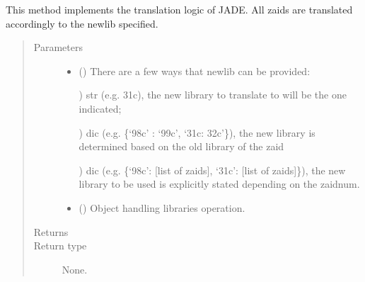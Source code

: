 \documentclass[letterpaper,10pt,english]{sphinxmanual}
\begin{document}
\begin{fulllineitems}
\begin{fulllineitems}
\end{fulllineitems}


\begin{fulllineitems}
\label{\detokenize{api/inputgeneration:matreader.SubMaterial.translate}}
\sphinxAtStartPar
This method implements the translation logic of JADE. All zaids are
translated accordingly to the newlib specified.
\begin{quote}\begin{description}
\item[{Parameters}] \leavevmode\begin{itemize}
\item {} 
\sphinxAtStartPar
{} () \textendash{} 
\sphinxAtStartPar
There are a few ways that newlib can be provided:

) str (e.g. 31c), the new library to translate to will be the
one indicated;

) dic (e.g. \{‘98c’ : ‘99c’, ‘31c: 32c’\}), the new library is
determined based on the old library of the zaid

) dic (e.g. \{‘98c’: {[}list of zaids{]}, ‘31c’: {[}list of zaids{]}\}),
the new library to be used is explicitly stated depending
on the zaidnum.


\item {} 
\sphinxAtStartPar
{} ({\hyperref[\detokenize{api/initobjects:libmanager.LibManager}]{}}) \textendash{} Object handling libraries operation.

\end{itemize}

\item[{Returns}] \leavevmode
\sphinxAtStartPar


\item[{Return type}] \leavevmode
\sphinxAtStartPar
None.

\end{description}\end{quote}


\end{fulllineitems}
\end{fulllineitems}
\end{document}
